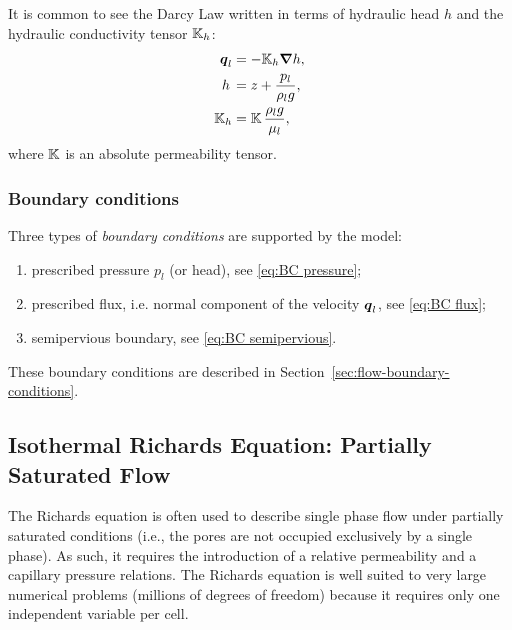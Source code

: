 It is common to see the Darcy Law written in terms of hydraulic head $h$
and the hydraulic conductivity tensor ${\mathbb K}_h$:
\begin{subequations}  \label{eq:HydraulicHead}
\begin{align}
  {\boldsymbol{q}}_l &= -{\mathbb K}_h {\boldsymbol{\nabla}} h,
  \\
  h \, &=  z + \frac{p_l}{\rho_l g},
  \\
  {\mathbb K}_h &= {\mathbb K} \, \frac{\rho_l g}{\mu_l},
\end{align}
\end{subequations}
where ${\mathbb K}$ is an absolute permeability tensor.

\subsubsection{Boundary conditions}


Three types of \textit{boundary conditions} are supported by the model:
\begin{enumerate}
\item
  prescribed pressure $p_l$ (or head), see \eqref{eq:BC pressure};
\item
  prescribed flux, i.e. normal component of the velocity ${\boldsymbol{q}}_l$, see \eqref{eq:BC flux};
\item
  semipervious boundary, see \eqref{eq:BC semipervious}. 
\end{enumerate}
These boundary conditions are described in Section~\ref{sec:flow-boundary-conditions}.



\subsection{Isothermal Richards Equation: Partially Saturated Flow}
\label{sec:richards-equation}

The Richards equation is often used to describe single phase flow under partially 
saturated conditions (i.e., the pores are not occupied exclusively by a single phase).  
As such, it requires the introduction of a relative permeability and a capillary 
pressure relations. %
The Richards equation is well suited to very large numerical problems (millions of 
degrees of freedom) because it requires only one independent variable per cell.


